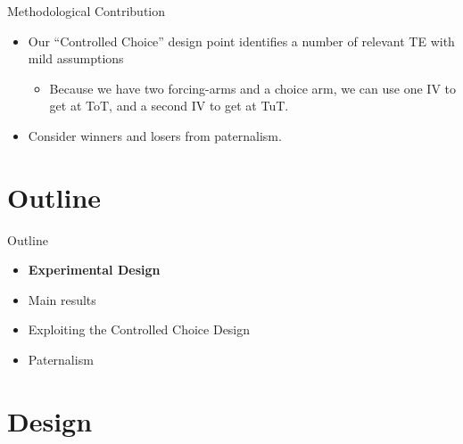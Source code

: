 \documentclass[8pt]{beamer}
\begin{document}
\begin{frame}{Methodological Contribution}
\begin{itemize}
    \vfill \item Our ``Controlled Choice'' design point identifies a number of relevant TE with mild assumptions
    \begin{itemize}
        \item Because we have two forcing-arms and a choice arm, we can use one IV to get at ToT, and a second IV to get at TuT.
    \end{itemize}
    
    
   \vfill  \item Consider winners and losers from paternalism.     

    
  


\end{itemize}
\end{frame}




\section{Outline}
\begin{frame}{Outline}
     \begin{itemize}
         \vfill\item \textbf{Experimental Design}
         \vfill\item Main results
          \vfill\item Exploiting the Controlled Choice Design
         \vfill\item Paternalism
     \end{itemize}
\end{frame}







\section{Design}
\end{document}
